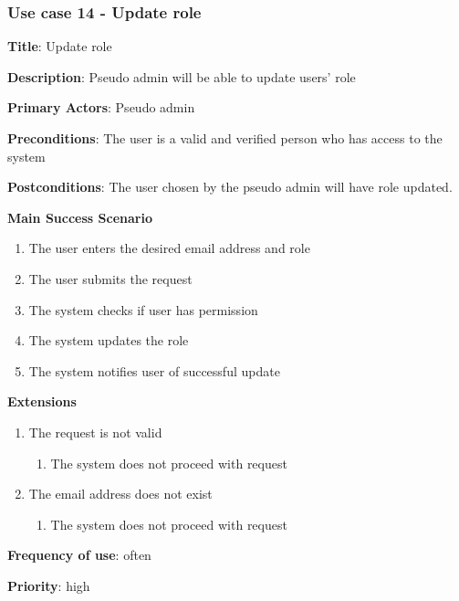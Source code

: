 \documentclass[singlespacing,12pt,parskip,headsepline,consistentlayout]{article}
\begin{document}
\subsubsection{Use case 14 - Update role}
\begin{flushleft}
\vspace{0.2cm}
\hline
\vspace{0.2cm}
{\bfseries Title}: {Update role}

{\bfseries Description}: {Pseudo admin will be able to update users' role}

{\bfseries Primary Actors}: {Pseudo admin}

{\bfseries Preconditions}: The user is a valid and verified person who has access to the system

{\bfseries Postconditions}: {The user chosen by the pseudo admin will have role updated.}

{\bfseries Main Success Scenario}

\begin{enumerate}
      \item The user enters the desired email address and role
      \item The user submits the request
      \item The system checks if user has permission
      \item The system updates the role
      \item The system notifies user of successful update
\end{enumerate}
 
{\bfseries Extensions}

\begin{enumerate}
  \item The request is not valid
  \begin{enumerate}
      \item The system does not proceed with request
  \end{enumerate}
  \item The email address does not exist
  \begin{enumerate}
      \item The system does not proceed with request
  \end{enumerate}
\end{enumerate}

{\bfseries Frequency of use}: often

{\bfseries Priority}: high

\end{flushleft}
\end{document}
